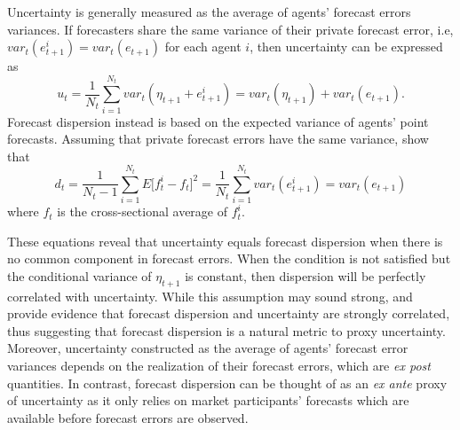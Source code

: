Uncertainty is generally measured as the average of agents' forecast errors variances. If forecasters share the same variance of their private forecast error, i.e, $var_t(e^i_{t+1}) = var_t(e_{t+1})$ for each agent $i$, then uncertainty can be expressed as
\begin{equation*} %
u_{t} = \frac{1}{N_t} \sum_{i=1}^{N_t} var_t(\eta_{t+1} + e^i_{t+1}) = var_t(\eta_{t+1}) + var_t(e_{t+1}).
\end{equation*}
Forecast dispersion instead is based on the expected variance of agents' point forecasts. Assuming that private forecast errors have the same variance, \citet{lahiri_sheng2010} show that
\begin{equation*}
d_{t} = \frac{1}{N_t - 1} \sum_{i=1}^{N_t} E\big[ f_t^i - f_{t}\big]^{2} = \frac{1}{N_t} \sum_{i=1}^{N_t} var_t(e^i_{t+1}) = var_t(e_{t+1})
\end{equation*}
where $f_t$ is the cross-sectional average of $f_t^i$.

These equations reveal that uncertainty equals forecast dispersion when there is no common component in forecast errors. When the condition is not satisfied but the conditional variance of $\eta_{t+1}$ is constant, then dispersion will be perfectly correlated with uncertainty. While this assumption may sound strong, \citet{bachmann_etal2013} and \citet{nimark2014} provide evidence that forecast dispersion and uncertainty are strongly correlated, thus suggesting that forecast dispersion is a natural metric to proxy uncertainty. Moreover, uncertainty constructed as the average of agents' forecast error variances depends on the realization of their forecast errors, which are \emph{ex post} quantities. In contrast, forecast dispersion can be thought of as an \emph{ex ante} proxy of uncertainty as it only relies on market participants' forecasts which are available before forecast errors are observed. %

